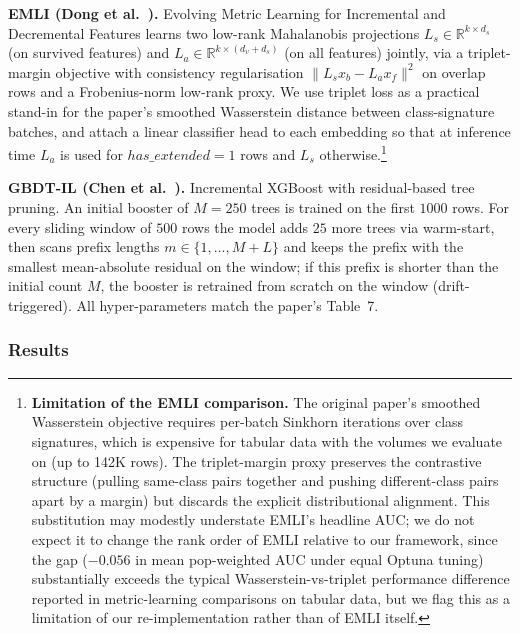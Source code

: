 \documentclass[sigconf]{acmart}
\begin{document}
\begin{itemize}
\textbf{EMLI (Dong et al.~\cite{dong2021eml}).} Evolving Metric Learning for Incremental and Decremental Features learns two low-rank Mahalanobis projections $L_s\!\in\!\mathbb{R}^{k\times d_s}$ (on survived features) and $L_a\!\in\!\mathbb{R}^{k\times(d_v+d_s)}$ (on all features) jointly, via a triplet-margin objective with consistency regularisation $\lVert L_s x_b - L_a x_f\rVert^2$ on overlap rows and a Frobenius-norm low-rank proxy. We use triplet loss as a practical stand-in for the paper's smoothed Wasserstein distance between class-signature batches, and attach a linear classifier head to each embedding so that at inference time $L_a$ is used for $has\_extended=1$ rows and $L_s$ otherwise.\footnote{\textbf{Limitation of the EMLI comparison.} The original paper's smoothed Wasserstein objective requires per-batch Sinkhorn iterations over class signatures, which is expensive for tabular data with the volumes we evaluate on (up to 142K rows). The triplet-margin proxy preserves the contrastive structure (pulling same-class pairs together and pushing different-class pairs apart by a margin) but discards the explicit distributional alignment. This substitution may modestly understate EMLI's headline AUC; we do not expect it to change the rank order of EMLI relative to our framework, since the gap ($-0.056$ in mean pop-weighted AUC under equal Optuna tuning) substantially exceeds the typical Wasserstein-vs-triplet performance difference reported in metric-learning comparisons on tabular data, but we flag this as a limitation of our re-implementation rather than of EMLI itself.}

\textbf{GBDT-IL (Chen et al.~\cite{chen2024gbdtil}).} Incremental XGBoost with residual-based tree pruning. An initial booster of $M{=}250$ trees is trained on the first $1000$ rows. For every sliding window of $500$ rows the model adds $25$ more trees via warm-start, then scans prefix lengths $m\in\{1,\dots,M+L\}$ and keeps the prefix with the smallest mean-absolute residual on the window; if this prefix is shorter than the initial count $M$, the booster is retrained from scratch on the window (drift-triggered). All hyper-parameters match the paper's Table~7.

\subsubsection{Results}


\end{itemize}
\end{document}
